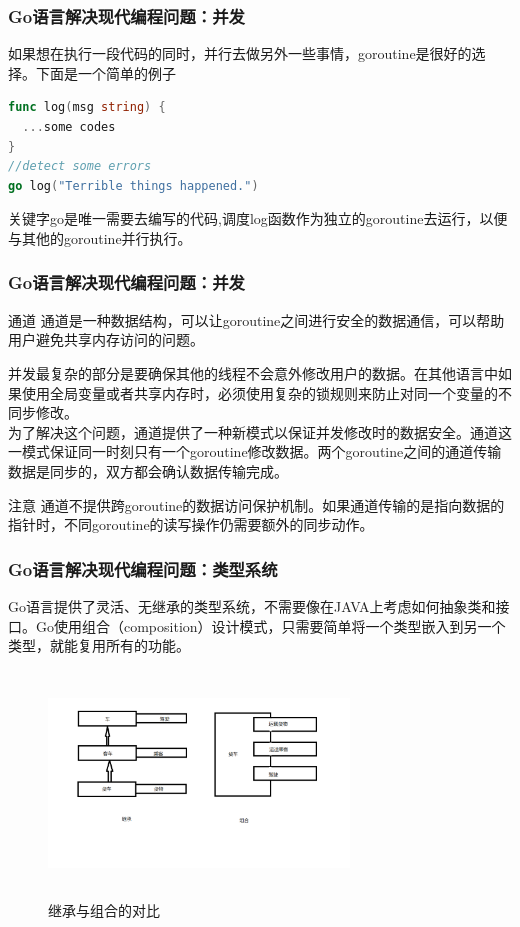 \documentclass{beamer}
\begin{document}
	
	\begin{frame}[fragile]
		\frametitle{Go语言解决现代编程问题：并发}
		\quad
		如果想在执行一段代码的同时，并行去做另外一些事情，goroutine是很好的选择。下面是一个简单的例子
\begin{lstlisting}[language=Go]
func log(msg string) {
  ...some codes
}
//detect some errors
go log("Terrible things happened.")
\end{lstlisting}
		\quad
		关键字go是唯一需要去编写的代码,调度log函数作为独立的goroutine去运行，以便与其他的goroutine并行执行。
	\end{frame}
	
	\begin{frame}[fragile]
	\frametitle{Go语言解决现代编程问题：并发}
	\begin{block}{通道}
		通道是一种数据结构，可以让goroutine之间进行安全的数据通信，可以帮助用户避免共享内存访问的问题。
	\end{block}
	\quad
	并发最复杂的部分是要确保其他的线程不会意外修改用户的数据。在其他语言中如果使用全局变量或者共享内存时，必须使用复杂的锁规则来防止对同一个变量的不同步修改。
	\\
	\quad
	为了解决这个问题，通道提供了一种新模式以保证并发修改时的数据安全。通道这一模式保证同一时刻只有一个goroutine修改数据。两个goroutine之间的通道传输数据是同步的，双方都会确认数据传输完成。
	\begin{alertblock}{注意}
		通道不提供跨goroutine的数据访问保护机制。如果通道传输的是指向数据的指针时，不同goroutine的读写操作仍需要额外的同步动作。
	\end{alertblock}
	\end{frame}
	
	\begin{frame}
		\frametitle{Go语言解决现代编程问题：类型系统}
		\quad
		Go语言提供了灵活、无继承的类型系统，不需要像在JAVA上考虑如何抽象类和接口。Go使用组合（composition）设计模式，只需要简单将一个类型嵌入到另一个类型，就能复用所有的功能。
		\begin{figure}[b]
			\caption{继承与组合的对比}
			\includegraphics[width=8cm, height=6cm]{继承组合.png}
		\end{figure}
	\end{frame}
	
\end{document}
